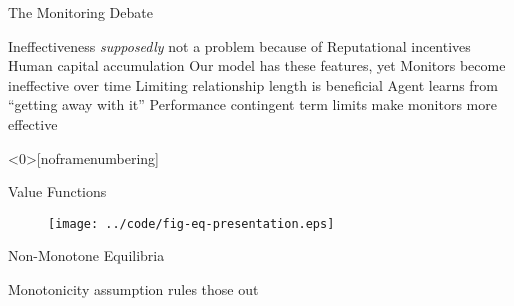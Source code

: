 \documentclass[usenames,dvipsnames]{beamer}
\newcommand{\bo}{\begin{outline}}
\newcommand{\eo}{\end{outline}}
\begin{document}
\begin{frame}{The Monitoring Debate}
\bo
\1 Ineffectiveness {\em supposedly} not a problem because of
\2 Reputational incentives 
\2 Human capital accumulation
\1 Our model has these features, yet
\2 Monitors become ineffective over time
\2 Limiting relationship length is beneficial
\1 Agent learns from ``getting away with it''
\1 Performance contingent term limits make monitors more effective
\eo
\end{frame}
%
%

\begin{frame}<0>[noframenumbering]


\end{frame}
\begin{frame}{Value Functions}\label{frame:ValueFunctions}
\begin{figure}[tbp]
        \texttt{[image: ../code/fig-eq-presentation.eps]}
\end{figure}
\hfill \hyperlink{frame:Prop1}{}
\end{frame}


\begin{frame}{Non-Monotone Equilibria}\label{frame:OtherEq}
\begin{center}
\end{center}

Monotonicity assumption rules those out\\
\bigskip
\hfill \hyperlink{frame:Prop1}{}
\end{frame}
\end{document}
